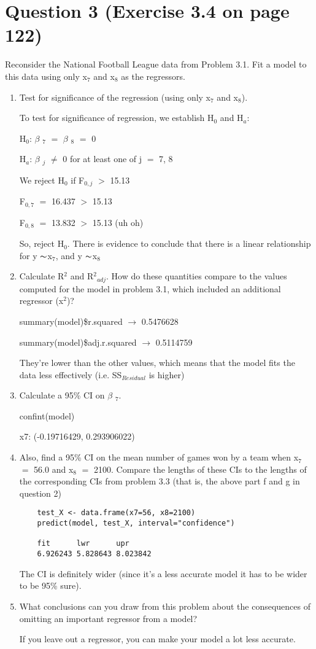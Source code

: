 \documentclass{article}
\newcommand{\mt}[1]{\ensuremath{#1}}
\newcommand\bsc[2][\DefaultOpt]{%
  \def\DefaultOpt{#2}%
  \section[#1]{#2}%
}
\newcommand{\balist}{\begin{enumerate}[label=\alph*.]}
\newcommand{\elist}{\end{enumerate}}
\newcommand{\bta}{\mt{\beta} }
\newcommand{\lra}{ \mt{\longrightarrow} } %
\newcommand{\gr}{\mt{\operatorname{>}} }
\newcommand{\eql}{ \mt{\operatorname{=}} }
\newcommand{\uw}[2]{#1\mt{_{#2}}}
\newcommand{\uf}[2]{#1\mt{^{#2}}}
\newcommand{\tl}{\mt{\thicksim}}
\begin{document}
\bsc{Question 3 (Exercise 3.4 on page 122)}{
Reconsider the National Football League data from Problem 3.1. Fit a model to this data using only \uw{x}{7} and \uw{x}{8} as the regressors.
\balist
\item Test for significance of the regression (using only \uw{x}{7} and \uw{x}{8}).

	To test for significance of regression, we establish \uw{H}{0} and \uw{H}{a}:

	\uw{H}{0}: \uw{\bta}{7} \eql \uw{\bta}{8} \eql 0 

	\uw{H}{a}: \uw{\bta}{j} $\neq$ 0 for at least one of j \eql 7, 8

	We reject \uw{H}{0} if \uw{F}{0, j} \gr 15.13
	
	\uw{F}{0, 7} \eql 16.437 \gr 15.13

	\uw{F}{0, 8} \eql 13.832 \gr 15.13 (uh oh)

	So, reject \uw{H}{0}. There is evidence to conclude that there is a linear relationship for y \tl \uw{x}{7}, and y \tl \uw{x}{8}
	
	
\item Calculate \uf{R}{2} and \uw{\uf{R}{2}}{adj}. How do these quantities compare to the values computed for the model in problem 3.1, which included an additional regressor (\uf{x}{2})?
	
	summary(model)\$r.squared \lra 0.5476628
	
	summary(model)\$adj.r.squared \lra 0.5114759
	
	They're lower than the other values, which means that the model fits the data less effectively (i.e. SS$_{Residual}$ is higher)
	
\item Calculate a 95\% CI on \uw{\bta}{7}.

	confint(model)
	
	x7: (-0.19716429,  0.293906022)
	
\item Also, find a 95\% CI on the mean number of games won by a team when \uw{x}{7} \eql 56.0 and \uw{x}{8} \eql 2100. Compare the lengths of these CIs to the lengths of the corresponding CIs from problem 3.3 (that is, the above part f and g in question 2)
	\begin{verbatim}
	test_X <- data.frame(x7=56, x8=2100)
	predict(model, test_X, interval="confidence")
    
    fit      lwr      upr
	6.926243 5.828643 8.023842
	\end{verbatim}
	
	The CI is definitely wider (since it's a less accurate model it has to be wider to be 95\% sure).
	
\item What conclusions can you draw from this problem about the consequences of omitting an important regressor from a model?
	
	If you leave out a regressor, you can make your model a lot less accurate.
\elist
}
\end{document}

